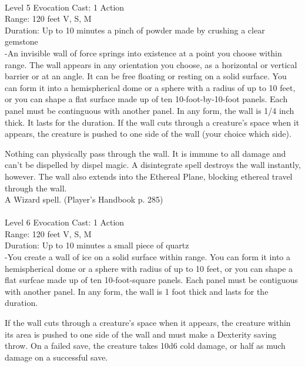 \documentclass[10pt,twocolumn]{report}
\begin{document}
 \\
Level 5 \quad Evocation \quad Cast: 1 Action\\
Range: 120 feet \quad V, S, M\\
Duration: Up to 10 minutes \quad a pinch of powder made by crushing a clear gemstone\\
-An invisible wall of force springs into existence at a point you choose within range.
The wall appears in any orientation you choose, as a horizontal or vertical barrier or at an angle. It can be free floating or resting on a solid surface. You can form it into a hemispherical dome or a sphere with a radius of up to 10 feet, or you can shape a flat surface made up of ten 10-foot-by-10-foot panels. Each panel must be continguous with another panel. In any form, the wall is 1/4 inch thick. It lasts for the duration. If the wall cuts through a creature’s space when it appears, the creature is pushed to one side of the wall (your choice which side).

Nothing can physically pass through the wall. It is immune to all damage and can’t be dispelled by dispel magic. A disintegrate spell destroys the wall instantly, however.  The wall also extends into the Ethereal Plane, blocking ethereal travel through the wall.\\
A Wizard spell. (Player's Handbook p. 285) \\


 \\
Level 6 \quad Evocation \quad Cast: 1 Action\\
Range: 120 feet \quad V, S, M\\
Duration: Up to 10 minutes \quad a small piece of quartz\\
-You create a wall of ice on a solid surface within range. You can form it into a hemispherical dome or a sphere with radius of up to 10 feet, or you can shape a flat surfcae made up of ten 10-foot-square panels. Each panel must be contiguous with another panel. In any form, the wall is 1 foot thick and lasts for the duration.

If the wall cuts through a creature’s space when it appears, the creature within its area is pushed to one side of the wall and must make a Dexterity saving throw. On a failed save, the creature takes 10d6 cold damage, or half as much damage on a successful save.
\end{document}
